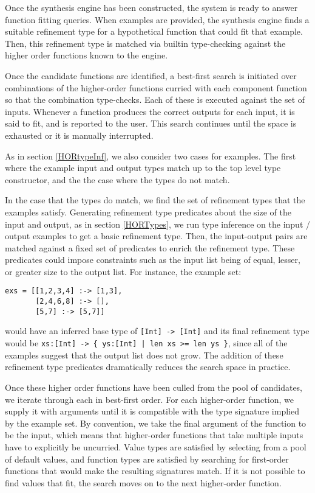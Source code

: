 Once the synthesis engine has been constructed, the system is ready to answer function fitting queries. When examples are provided, the synthesis engine finds a suitable refinement type for a hypothetical function that could fit that example. Then, this refinement type is matched via builtin type-checking against the higher order functions known to the engine.

Once the candidate functions are identified, a best-first search is initiated over combinations of the higher-order functions curried with each component function so that the combination type-checks. Each of these is executed against the set of inputs. Whenever a function produces the correct outputs for each input, it is said to fit, and is reported to the user. This search continues until the space is exhausted or it is manually interrupted.

As in section \ref{HORtypeInf}, we also consider two cases for examples. The first where the example input and output types match up to the top level type constructor, and the the case where the types do not match.

In the case that the types do match, we find the set of refinement types that the examples satisfy. Generating refinement type predicates about the size of the input and output, as in section \ref{HORTypes}, we run type inference on the input / output examples to  get a basic refinement type. Then, the input-output pairs are matched against a fixed set of predicates to enrich the refinement type. These predicates could impose constraints such as the input list being of equal, lesser, or greater size to the output list.  For instance, the example set:
\begin{verbatim}
exs = [[1,2,3,4] :-> [1,3],
       [2,4,6,8] :-> [],
       [5,7] :-> [5,7]]
\end{verbatim}
\noindent would have an inferred base type  of \texttt{[Int] -> [Int]} and its final refinement type would be \texttt{xs:[Int] -> \{ ys:[Int] | len xs >= len ys \}}, since all of the examples suggest that the output list does not grow. The addition of these refinement type predicates dramatically reduces the search space in practice.

Once these higher order functions have been culled from the pool of candidates, we iterate through each in best-first order. For each higher-order function, we supply it with arguments until it is compatible with the type signature implied by the example set. By convention, we take the final argument of the function to be the input, which means that higher-order functions that take multiple inputs have to explicitly be uncurried. Value types are satisfied by selecting from a pool of default values, and function types are satisfied by searching for first-order functions that would make the resulting signatures match. If it is not possible to find values that fit, the search moves on to the next higher-order function.

